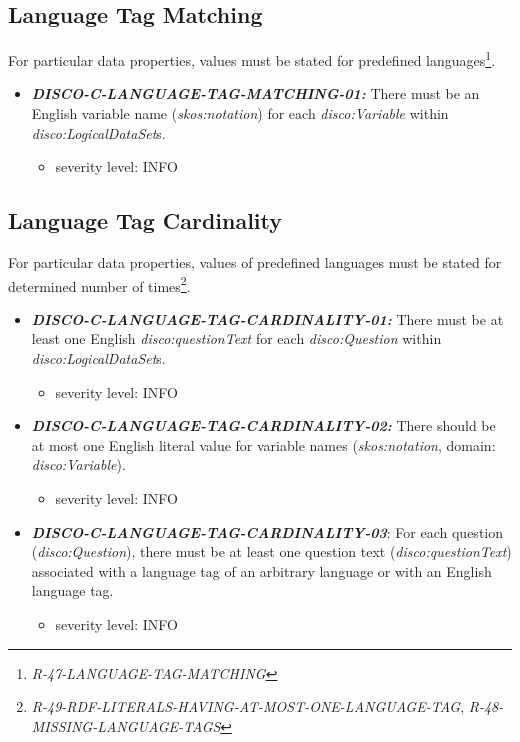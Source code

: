 \documentclass{llncs}
\begin{document}
\subsection{Language Tag Matching}

For particular data properties, values must be stated for predefined languages\footnote{{\em R-47-LANGUAGE-TAG-MATCHING}}.

\begin{itemize}
	\item \textbf{{\em DISCO-C-LANGUAGE-TAG-MATCHING-01:}}
There must be an English variable name ({\em skos:notation}) for each {\em disco:Variable} within {\em disco:LogicalDataSet}s.
\begin{itemize}
	\item severity level: INFO
\end{itemize}
\end{itemize}

\subsection{Language Tag Cardinality}

For particular data properties, values of predefined languages must be stated for determined number of times\footnote{{\em R-49-RDF-LITERALS-HAVING-AT-MOST-ONE-LANGUAGE-TAG}, {\em R-48-MISSING-LANGUAGE-TAGS}}.

\begin{itemize}

	\item \textbf{{\em DISCO-C-LANGUAGE-TAG-CARDINALITY-01:}}
  There must be at least one English {\em disco:questionText} for each {\em disco:Question} within {\em disco:LogicalDataSet}s.
\begin{itemize}
	\item severity level: INFO
\end{itemize}
  \item \textbf{{\em DISCO-C-LANGUAGE-TAG-CARDINALITY-02:}}
  There should be at most one English literal value for variable names ({\em skos:notation}, domain: {\em disco:Variable}).
\begin{itemize}
	\item severity level: INFO
\end{itemize}
  \item \textbf{{\em DISCO-C-LANGUAGE-TAG-CARDINALITY-03}}:
	For each question (\emph{disco:Question}), there must be at least one question text (\emph{disco:questionText}) associated with a language tag of an arbitrary language or with an English language tag.
\begin{itemize}
	\item severity level: INFO
\end{itemize}
\end{itemize}
\end{document}
